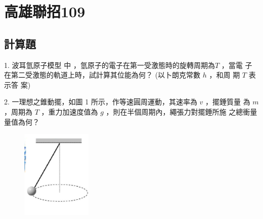 \documentclass[cn,10pt,math=newtx]{elegantbook}
\begin{document}
\newpage




\chapter{高雄聯招109}
\section{計算題}

\begin{example}
   1. 波耳氫原子模型 中 ，氫原子的電子在第一受激態時的旋轉周期為$T$ ，當電
子 在第二受激態的軌道上時，試計算其位能為何？ (以卜朗克常數 $h$ ，和周
期 $T$ 表 示答 案)\\
    \rightline{[高雄聯招教甄109]}
\end{example}
\begin{solution}
    
\end{solution}

\newpage

\begin{example}
   2. 一理想之錐動擺，如圖 1 所示，作等速圓周運動，其速率為 $v$ ，擺錘質量
為 $m$ ，周期為 $T$ ，重力加速度值為 $g$ ，則在半個周期內，繩張力對擺錘所施
之總衝量量值為何？\\
    \rightline{[高雄聯招教甄109]}
\end{example}
\begin{solution}
    
\end{solution}
\begin{figure}[htbp]
    \flushright
    \includegraphics[width=0.3\textwidth]{image/109高雄2.png}
  \end{figure}
\newpage
\end{document}
